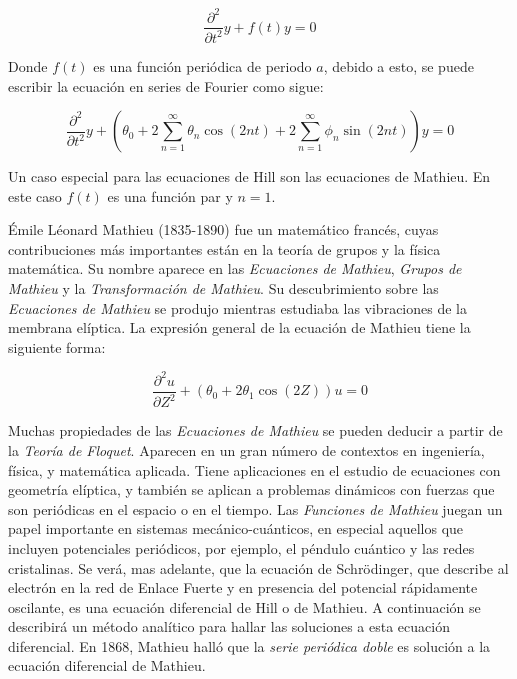 \begin{equation}\label{eq:4.1}
    \frac{\partial^2}{\partial t^2}y+f(t)y=0
\end{equation}

Donde $f(t)$ es una función periódica de periodo $a$, debido a esto, se puede escribir la ecuación en series de Fourier como sigue: 

\begin{equation}\label{eq:4.2}
   \frac{\partial^2}{\partial t^2}y+\left(\theta_0+2\sum^{\infty}_{n=1}\theta_n\cos(2nt)+2\sum^{\infty}_{n=1}\phi_n\sin(2nt)\right)y=0
\end{equation}

Un caso especial para las ecuaciones de Hill son las ecuaciones de Mathieu. En este caso $f(t)$ es una función par y $n=1$.

Émile Léonard Mathieu (1835-1890) fue un matemático francés, cuyas contribuciones más importantes están en la teoría de grupos y la física matemática. Su nombre aparece en las \textit{Ecuaciones de Mathieu}, \textit{Grupos de Mathieu} y la \textit{Transformación de Mathieu}. Su descubrimiento sobre las \textit{Ecuaciones de Mathieu} se produjo mientras estudiaba las vibraciones de la membrana elíptica. La expresión general de la ecuación de Mathieu tiene la siguiente forma:

\begin{equation}\label{eq:4.3}
    \frac{\partial^2u}{\partial Z^2}+\left(\theta_0+2\theta_1\cos(2Z)\right)u=0
\end{equation}

Muchas propiedades de las \textit{Ecuaciones de Mathieu} se pueden deducir a partir de la \textit{Teoría de Floquet}. Aparecen en un gran número de contextos en ingeniería, física, y matemática aplicada. Tiene aplicaciones en el estudio de ecuaciones con geometría elíptica, y también se aplican a problemas dinámicos con fuerzas que son periódicas en el espacio o en el tiempo.
Las \textit{Funciones de Mathieu} juegan un papel importante en sistemas mecánico-cuánticos, en especial aquellos que incluyen potenciales periódicos, por ejemplo, el péndulo cuántico y las redes cristalinas. Se verá, mas adelante, que la ecuación de Schrödinger, que describe al electrón en la red de Enlace Fuerte y en presencia del potencial rápidamente oscilante, es una ecuación diferencial de Hill o de Mathieu. A continuación se describirá un método analítico para hallar las soluciones a esta ecuación diferencial.
En 1868, Mathieu halló que la \textit{serie periódica doble} es solución a la ecuación diferencial de Mathieu.


